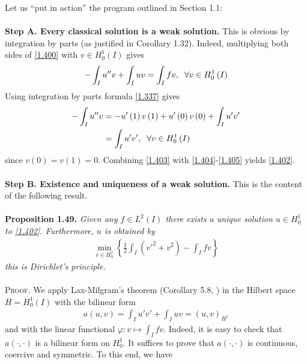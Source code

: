 \documentclass[a4paper,oneside]{article}
\numberwithin{equation}{section}
\begin{document}
Let us ``put in action'' the program outlined in Section 1.1:\\
\\
\textbf{Step A. Every classical solution is a weak solution.} This is obvious by integration by parts (as justified in Corollary 1.32). Indeed, multiplying both sides of \eqref{1.400} with $v\in H_0^1\left(I\right)$ gives
\begin{align}
\label{1.403}
 - \int_I {u''v}  + \int_I {uv}  = \int_I {fv} ,\hspace{0.2cm}\forall v \in H_0^1\left( I \right)
\end{align}
Using integration by parts formula \eqref{1.337} gives
\begin{align}
\label{1.404}
 - \int_I {u''v}  &=  - u'\left( 1 \right)v\left( 1 \right) + u'\left( 0 \right)v\left( 0 \right) + \int_I {u'v'} \\
& = \int_I {u'v'}  ,\hspace{0.2cm}\forall v \in H_0^1\left( I \right) \label{1.405}
\end{align}
since $v\left(0\right)=v\left(1\right)=0$. Combining \eqref{1.403} with \eqref{1.404}-\eqref{1.405} yields \eqref{1.402}.\\
\\
\textbf{Step B. Existence and uniqueness of a weak solution.} This is the content of the following result.\\
\\
\textbf{Proposition 1.49.} \textit{Given any $f\in L^2\left(I\right)$ there exists a unique solution $u\in H_0^1$ to \eqref{1.402}. Furthermore, $u$ is obtained by}
\begin{align}
\label{1.406}
\mathop {\min }\limits_{v \in H_0^1} \left\{ {\frac{1}{2}\int_I {\left( {v{'^2} + {v^2}} \right)}  - \int_I {fv} } \right\}
\end{align}
\textit{this is Dirichlet's principle.}\\
\\
\textsc{Proof.} We apply Lax-Milgram's theorem (Corollary 5.8, \cite{1}) in the Hilbert space $H=H_0^1\left(I\right)$ with the bilinear form
\begin{align}
\label{1.407}
a\left( {u,v} \right) = \int_I {u'v'}  + \int_I {uv}  = {\left( {u,v} \right)_{{H^1}}}
\end{align}
and with the linear functional $\varphi :v \mapsto \int_I {fv} $. Indeed, it is easy to check that $a\left( { \cdot , \cdot } \right)$ is a bilinear form on $H_0^1$. It suffices to prove that $a\left( { \cdot , \cdot } \right)$ is continuous, coercive and symmetric. To this end, we have
\end{document}

